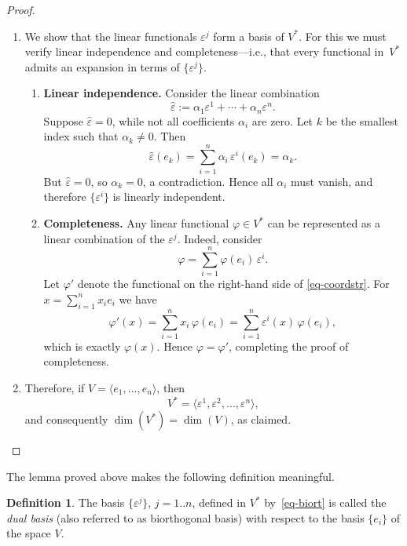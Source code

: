 \documentclass{article}
\theoremstyle{definition}
\theoremstyle{definition}
\newtheorem{definition}{Definition}
\numberwithin{figure}{section}
\newcommand{\1}{\mathbf{1}}
\begin{document}
\begin{proof}
\begin{enumerate}

\item We show that the linear functionals $\varepsilon^j$ form a basis of $V^*$. For this we must verify linear independence and completeness—i.e., that every functional in~$V^*$ admits an expansion in terms of $\{\varepsilon^j\}$.

\begin{enumerate}
    \item \textbf{Linear independence.}  
    Consider the linear combination
    \[
        \hat{\varepsilon} := \alpha_1 \varepsilon^1 + \cdots + \alpha_n \varepsilon^n.
    \]
    Suppose $\hat{\varepsilon} = 0$, while not all coefficients $\alpha_i$ are zero. Let $k$ be the smallest index such that $\alpha_k \neq 0$. Then
    \[
        \hat{\varepsilon}(e_k)
        = \sum_{i=1}^n \alpha_i\, \varepsilon^i(e_k)
        = \alpha_k.
    \]
    But $\hat{\varepsilon} = 0$, so $\alpha_k = 0$, a contradiction. Hence all $\alpha_i$ must vanish, and therefore $\{\varepsilon^i\}$ is linearly independent.

    \item \textbf{Completeness.}  
    Any linear functional $\varphi \in V^*$ can be represented as a linear combination of the $\varepsilon^j$. Indeed, consider
    \begin{equation}\label{eq-coordstr}
        \varphi = \sum_{i=1}^n \varphi(e_i)\,\varepsilon^i.
    \end{equation}
    Let $\varphi'$ denote the functional on the right-hand side of \eqref{eq-coordstr}. For $x = \sum_{i=1}^n x_i e_i$ we have
    \[
        \varphi'(x)
        = \sum_{i=1}^n x_i\,\varphi(e_i)
        = \sum_{i=1}^n \varepsilon^i(x)\,\varphi(e_i),
    \]
    which is exactly $\varphi(x)$. Hence $\varphi = \varphi'$, completing the proof of completeness.
\end{enumerate}

\item Therefore, if $V = \langle e_1,\ldots, e_n \rangle$, then
\[
    V^* = \langle \varepsilon^1, \varepsilon^2, \ldots, \varepsilon^n \rangle,
\]
and consequently $\dim(V^*) = \dim(V)$, as claimed.
\end{enumerate}
\end{proof}

The lemma proved above makes the following definition meaningful.

\begin{definition}
The basis $\{\varepsilon^j\}$, $j = 1..n$, defined in $V^*$ by~\eqref{eq-biort} is called the \emph{dual basis} (also referred to as biorthogonal basis) with respect to the basis $\{e_i\}$ of the space $V$.
\end{definition}
\end{document}
